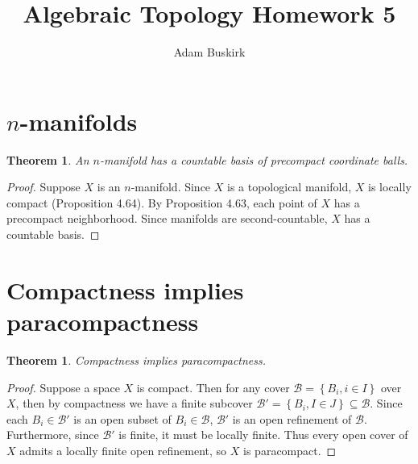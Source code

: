 \documentclass{article}
\title{Algebraic Topology Homework 5}
\author{Adam Buskirk}
\newtheorem{theorem}[subsection]{Theorem}
\theoremstyle{definition}
\newcommand{\set}[1]{\left\{#1\right\}}
\begin{document}
\maketitle

\section{$n$-manifolds}
\begin{theorem}
An $n$-manifold has a countable basis of precompact coordinate balls.
\end{theorem}
\begin{proof}
Suppose $X$ is an $n$-manifold. Since $X$ is a topological manifold, 
$X$ is locally compact (Proposition 4.64). By Proposition 4.63, each
point of $X$ has a precompact neighborhood. Since manifolds are
second-countable, $X$ has a countable basis.
\end{proof}

\section{Compactness implies paracompactness}
\begin{theorem}
Compactness implies paracompactness.
\end{theorem}
\begin{proof}
Suppose a space $X$ is compact. Then for any cover $\mathcal{B}
=\set{B_i, i\in I}$ over $X$,
then by compactness we have a finite subcover 
$\mathcal{B}'=\set{B_i, I\in J} \subseteq \mathcal{B}$. Since each 
$B_i \in \mathcal{B}'$ is an open subset of $B_i \in \mathcal{B}$, 
$\mathcal{B}'$ is an open refinement of $\mathcal{B}$. Furthermore, since
$\mathcal{B}'$ is finite, it must be locally finite. Thus
every open cover of $X$ admits a locally finite open refinement, so $X$
is paracompact.
\end{proof}
\end{document}
